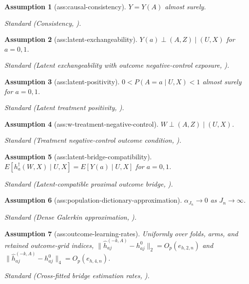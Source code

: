 \documentclass{article}
\newtheorem{assumption}{Assumption}
\begin{document}
\begin{assumption}[ass:causal-consistency]\label{ass:causal-consistency}
\(Y=Y(A)\) almost surely.
\par\smallskip\noindent\emph{Standard} (Consistency, \cite{MiaoGengTchetgen2018Proxy}).
\end{assumption}

\begin{assumption}[ass:latent-exchangeability]\label{ass:latent-exchangeability}
\(Y(a)\perp(A,Z)\mid(U,X)\) for \(a=0,1\).
\par\smallskip\noindent\emph{Standard} (Latent exchangeability with outcome negative-control exposure, \cite{MiaoGengTchetgen2018Proxy}).
\end{assumption}

\begin{assumption}[ass:latent-positivity]\label{ass:latent-positivity}
\(0<P(A=a\mid U,X)<1\) almost surely for \(a=0,1\).
\par\smallskip\noindent\emph{Standard} (Latent treatment positivity, \cite{MiaoGengTchetgen2018Proxy}).
\end{assumption}

\begin{assumption}[ass:w-treatment-negative-control]\label{ass:w-treatment-negative-control}
\(W\perp(A,Z)\mid(U,X)\).
\par\smallskip\noindent\emph{Standard} (Treatment negative-control outcome condition, \cite{MiaoGengTchetgen2018Proxy}).
\end{assumption}

\begin{assumption}[ass:latent-bridge-compatibility]\label{ass:latent-bridge-compatibility}
\(E[h_a^\dagger(W,X)\mid U,X]=E[Y(a)\mid U,X]\) for \(a=0,1\).
\par\smallskip\noindent\emph{Standard} (Latent-compatible proximal outcome bridge, \cite{MiaoGengTchetgen2018Proxy}).
\end{assumption}

\begin{assumption}[ass:population-dictionary-approximation]\label{ass:population-dictionary-approximation}
\(\alpha_{J_n}\to0\) as \(J_n\to\infty\).
\par\smallskip\noindent\emph{Standard} (Dense Galerkin approximation, \cite{AiChen2012SequentialMoments}).
\end{assumption}

\begin{assumption}[ass:outcome-learning-rates]\label{ass:outcome-learning-rates}
Uniformly over folds, arms, and retained outcome-grid indices, \(\|\widehat h_{aj}^{(-k,A)}-h^0_{aj}\|_2=O_p(e_{h,2,n})\) and \(\|\widehat h_{aj}^{(-k,A)}-h^0_{aj}\|_4=O_p(e_{h,4,n})\).
\par\smallskip\noindent\emph{Standard} (Cross-fitted bridge estimation rates, \cite{BennettEtAl2023SourceConditionDR}).
\end{assumption}
\end{document}
